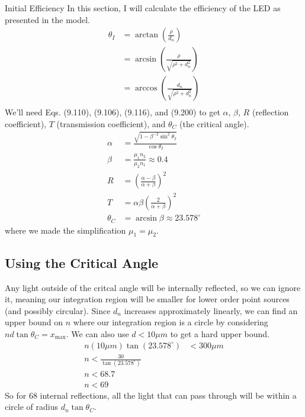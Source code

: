 \documentclass[12pt]{article}
\newcommand{\enterProblemHeader}[1]{
	\rhead{#1}
}
\newenvironment{main_section}[1]{
	\section{#1}
	\enterProblemHeader{#1}
}{
	\pagebreak
}
\begin{document}
\begin{main_section}{Initial Efficiency}
	In this section, I will calculate the efficiency of the LED as presented in
	the model.
	\begin{align*}
		\theta_I &= \arctan \left( \frac \rho {d_n} \right)\\
		&= \arcsin \left( \frac \rho {\sqrt{\rho^2 + d_n^2}} \right)\\
		&= \arccos \left( \frac {d_n} {\sqrt{\rho^2 + d_n^2}} \right)\\
	\end{align*}
	We'll need Eqs. (9.110), (9.106), (9.116), and (9.200) to get $\alpha$,
	$\beta$, $R$ (reflection coefficient), $T$ (transmission coefficient), and
	$\theta_C$ (the critical angle).
	\begin{align*}
		\alpha &= \frac { \sqrt{1 - \beta^{-2} \sin^2 \theta_I} } {\cos \theta_I}
		\tag{9.110}\\
		\beta &= \frac {\mu_1 n_2} {\mu_2 n_1} \approx 0.4 \tag{9.106}\\
		R &= \left( \frac { \alpha - \beta } { \alpha + \beta } \right)^2
		\tag{9.115}\\
		T &= \alpha \beta \left( \frac 2 {\alpha + \beta} \right)^2\tag{9.116}\\
		\theta_C &= \arcsin \beta \tag{9.200} \approx 23.578^\circ
	\end{align*}
	where we made the simplification $\mu_1 = \mu_2$.

	\subsection{Using the Critical Angle}

	Any light outside of the critcal angle will be internally reflected, so we
	can ignore it, meaning our integration region will be smaller for lower
	order point sources (and possibly circular). Since $d_n$ increases
	approximately linearly, we can find an upper bound on $n$ where our
	integration region is a circle by considering $n d \tan \theta_C =
	x_\text{max}$. We can also use $d < 10 \si{\mu m}$ to get a hard upper
	bound.
	\begin{align*}
		n (10 \si{\mu m}) \tan(23.578^\circ) &< 300 \si{\mu m}\\
		n < \frac {30} {\tan(23.578^\circ)}\\
		n < 68.7\\
		n < 69 %
	\end{align*}
	So for 68 internal reflections, all the light that can pass through will be
	within a circle of radius $d_n \tan \theta_C$.


\end{main_section}
\end{document}
